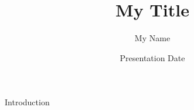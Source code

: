 \documentclass[xcolor=table]{beamer}
\title{My Title}
\author{My Name}
\institute{My Institiution}
\date{Presentation Date}
\let\otp\titlepage
\renewcommand{\titlepage}{\otp\addtocounter{framenumber}{-1}}
\begin{document}
\begin{frame}[plain]
\titlepage
\end{frame}

\begin{frame}{Introduction}
\end{frame}
\end{document}
